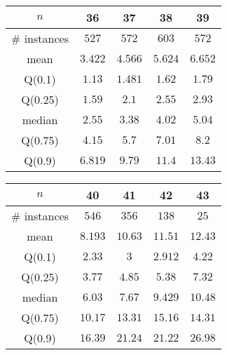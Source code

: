 \begin{tabular}{c|cccc} 
\hline 
$n$ & 36 & 37 & 38 & 39 \tabularnewline 
\hline 
\hline 
\# instances & $527$ & $572$ & $603$ & $572$ \tabularnewline 
mean & $3.422$ & $4.566$ & $5.624$ & $6.652$ \tabularnewline 
Q(0.1) & $1.13$ & $1.481$ & $1.62$ & $1.79$ \tabularnewline 
Q(0.25) & $1.59$ & $2.1$ & $2.55$ & $2.93$ \tabularnewline 
median & $2.55$ & $3.38$ & $4.02$ & $5.04$ \tabularnewline 
Q(0.75) & $4.15$ & $5.7$ & $7.01$ & $8.2$ \tabularnewline 
Q(0.9) & $6.819$ & $9.79$ & $11.4$ & $13.43$ \tabularnewline 
\hline 
\end{tabular} 
\medskip{} 

\begin{tabular}{c|cccc} 
\hline 
$n$ & 40 & 41 & 42 & 43 \tabularnewline 
\hline 
\hline 
\# instances & $546$ & $356$ & $138$ & $25$ \tabularnewline 
mean & $8.193$ & $10.63$ & $11.51$ & $12.43$ \tabularnewline 
Q(0.1) & $2.33$ & $3$ & $2.912$ & $4.22$ \tabularnewline 
Q(0.25) & $3.77$ & $4.85$ & $5.38$ & $7.32$ \tabularnewline 
median & $6.03$ & $7.67$ & $9.429$ & $10.48$ \tabularnewline 
Q(0.75) & $10.17$ & $13.31$ & $15.16$ & $14.31$ \tabularnewline 
Q(0.9) & $16.39$ & $21.24$ & $21.22$ & $26.98$ \tabularnewline 
\hline 
\end{tabular} 
\medskip{} 

